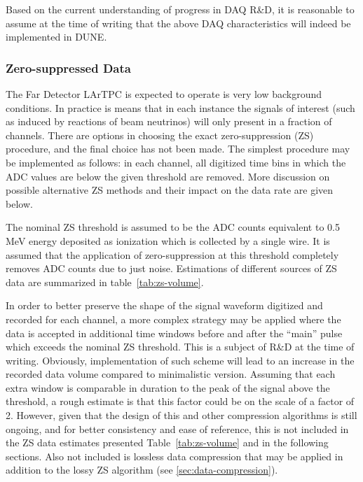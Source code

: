 Based on the current understanding of progress in DAQ R\&D, it is reasonable to assume at the time of
writing that the above DAQ characteristics will indeed be implemented in DUNE.




\subsubsection{Zero-suppressed Data}
\label{sec:zs-data}
The Far Detector LArTPC is expected to operate is very low background conditions. In practice
is means that in each instance the signals of interest (such as induced by reactions of beam neutrinos)
will only present in a fraction of channels. There are options in choosing the exact zero-suppression (ZS)
procedure, and the final choice has not been made. The simplest procedure may be implemented
as follows: in each channel, all digitized time bins in which the ADC values are below the given threshold
are removed. More discussion on possible alternative ZS methods and their impact on the data rate are given below.

The nominal ZS threshold is assumed to be the ADC counts equivalent to 0.5\,MeV energy deposited as
ionization which is collected by a single wire. It is assumed that the application of zero-suppression at this
threshold completely removes ADC counts due to just noise. %
Estimations of different sources of ZS data are summarized in table~\ref{tab:zs-volume}.

In order to better preserve the shape of the signal waveform digitized and recorded for
each channel, a more complex strategy may be applied where the data is accepted in additional
time windows before and after the ``main'' pulse which exceeds the nominal ZS threshold. This
is a subject of R\&D at the time of writing. Obviously, implementation of such scheme will lead
to an increase in the recorded data volume compared to minimalistic version. Assuming that
each extra window is comparable in duration to the peak of the signal above the threshold,
a rough estimate is that this factor could be on the scale of a factor of 2. However, given
that the design of this and other compression algorithms is still ongoing, and for better consistency
and ease of reference, this is not included in the ZS data estimates presented Table~\ref{tab:zs-volume}
and in the following sections. Also not included is lossless data compression that may be applied
in addition to the lossy ZS algorithm (see \ref{sec:data-compression}).
	
